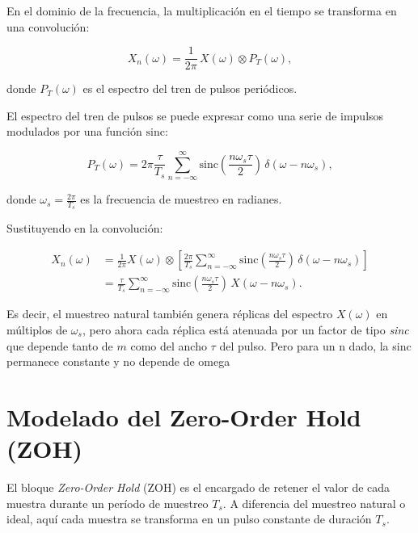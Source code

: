 En el dominio de la frecuencia, la multiplicación en el tiempo se transforma en una convolución:

\begin{equation}
    X_n(\omega) = \frac{1}{2\pi} \, X(\omega) \otimes P_T(\omega),
\end{equation}

donde $P_T(\omega)$ es el espectro del tren de pulsos periódicos. 

\bigskip

El espectro del tren de pulsos se puede expresar como una serie de impulsos modulados por una función
$\mathrm{sinc}$:

\begin{equation}
    P_T(\omega) = 2\pi\frac{\tau}{T_s} \sum_{n=-\infty}^{\infty} 
    \mathrm{sinc}\!\left(\frac{n\omega_s \tau}{2}\right) \, \delta(\omega - n\omega_s),
\end{equation}

donde $\omega_s = \tfrac{2\pi}{T_s}$ es la frecuencia de muestreo en radianes. 

\bigskip

Sustituyendo en la convolución:

\begin{align}
    X_n(\omega) 
    &= \frac{1}{2\pi} X(\omega) \otimes 
       \left[ \frac{2\pi}{T_s} \sum_{n=-\infty}^{\infty} 
       \mathrm{sinc}\!\left(\frac{n\omega_s \tau}{2}\right) \, \delta(\omega - n\omega_s) \right] \\[6pt]
    &= \frac{\tau}{T_s} \sum_{n=-\infty}^{\infty} 
       \mathrm{sinc}\!\left(\frac{n\omega_s \tau}{2}\right) \, X(\omega - n\omega_s).
\end{align}

\bigskip

Es decir, el muestreo natural también genera réplicas del espectro $X(\omega)$ en múltiplos de $\omega_s$, 
pero ahora cada réplica está atenuada por un factor de tipo \textit{sinc} que depende tanto de $m$ como del ancho $\tau$ 
del pulso. Pero para un n dado, la sinc permanece constante y no depende de omega

\section*{Modelado del Zero-Order Hold (ZOH)}

El bloque \textit{Zero-Order Hold} (ZOH) es el encargado de retener el valor de cada muestra
durante un período de muestreo $T_s$. A diferencia del muestreo natural o ideal, aquí 
cada muestra se transforma en un pulso constante de duración $T_s$. 

